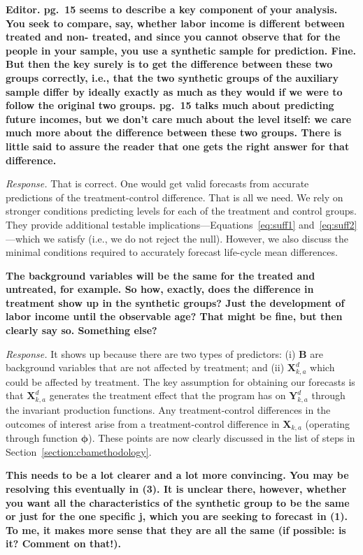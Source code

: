 \noindent \textbf{Editor. pg.\ 15 seems to describe a key component of your analysis. You seek to compare, say, whether labor income is different between treated and non- treated, and since you cannot observe that for the people in your sample, you use a synthetic sample for prediction. Fine. But then the key surely is to get the difference between these two groups correctly, i.e., that the two synthetic groups of the auxiliary sample differ by ideally exactly as much as they would if we were to follow the original two groups. pg.\ 15 talks much about predicting future incomes, but we don't care much about the level itself: we care much more about the difference between these two groups. There is little said to assure the reader that one gets the right answer for that difference.}

\noindent \textit{Response.} That is correct. One would get valid forecasts from accurate predictions of the treatment-control difference. That is all we need. We rely on stronger conditions predicting levels for each of the treatment and control groups. They provide additional testable implications---Equations~\eqref{eq:suff1} and~\eqref{eq:suff2}---which we satisfy (i.e., we do not reject the null). However, we also discuss the minimal conditions required to accurately forecast life-cycle mean differences.

\noindent \textbf{The background variables will be the same for the treated and untreated, for example. So how, exactly, does the difference in treatment show up in the synthetic groups?  Just the development of labor income until the observable age? That might be fine, but then clearly say so. Something else?}

\noindent \textit{Response.} It shows up because there are two  types of predictors: (i) $\bm{B}$ are background variables that are not affected by treatment; and (ii) $\bm{X}_{k,a}^d$ which could be affected by treatment. The key assumption for obtaining our forecasts is that $\bm{X}_{k,a}^d$ generates the treatment effect that the program has on $\bm{Y}_{k,a}^d$ through the invariant production functions. Any treatment-control differences in the outcomes of interest arise from a treatment-control difference in $\bm{X}_{k,a}$ (operating through function $\bm{\phi}$). These points are now clearly discussed in the list of steps in Section~\ref{section:cbamethodology}.

\noindent \textbf{This needs to be a lot clearer and a lot more convincing. You may be resolving this eventually in (3). It is unclear there, however, whether you want all the characteristics of the synthetic group to be the same or just for the one specific j, which you are seeking to forecast in (1). To me, it makes more sense that they are all the
same (if possible: is it? Comment on that!).}

